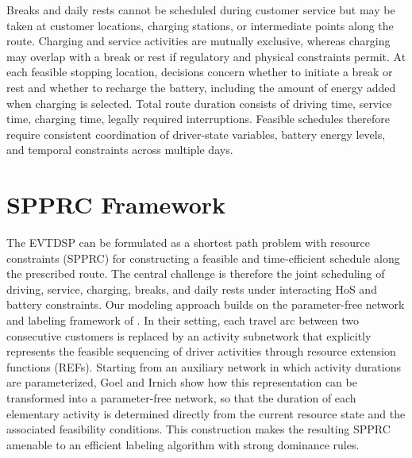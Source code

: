 \documentclass[3p,11pt,authoryear]{elsarticle}  %
\begin{document}
Breaks and daily rests cannot be scheduled during customer service but may be taken at customer locations, charging stations, or intermediate points along the route. Charging and service activities are mutually exclusive, whereas charging may overlap with a break or rest if regulatory and physical constraints permit. At each feasible stopping location, decisions concern whether to initiate a break or rest and whether to recharge the battery, including the amount of energy added when charging is selected. Total route duration consists of driving time, service time, charging time, legally required interruptions. Feasible schedules therefore require consistent coordination of driver-state variables, battery energy levels, and temporal constraints across multiple days.
%

\section{ SPPRC Framework} %


The EVTDSP can be formulated as a shortest path problem with resource constraints (SPPRC) for constructing a feasible and time-efficient schedule along the prescribed route. The central challenge is therefore the joint scheduling of driving, service, charging, breaks, and daily rests under interacting HoS and battery constraints. Our modeling approach builds on the parameter-free network and labeling framework of \citet{goel2017exact}. In their setting, each travel arc between two consecutive customers is replaced by an activity subnetwork that explicitly represents the feasible sequencing of driver activities through resource extension functions (REFs). Starting from an auxiliary network in which activity durations are parameterized, Goel and Irnich show how this representation can be transformed into a parameter-free network, so that the duration of each elementary activity is determined directly from the current resource state and the associated feasibility conditions. This construction makes the resulting SPPRC amenable to an efficient labeling algorithm with strong dominance rules.
\end{document}
